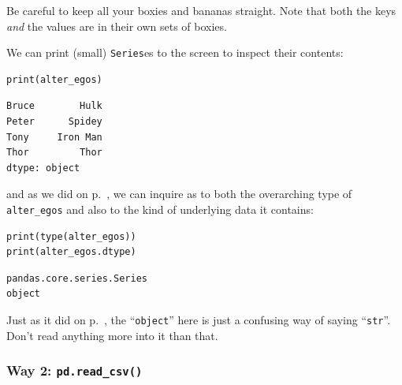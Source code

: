 
Be careful to keep all your boxies and bananas straight. Note that both the
keys \textit{and} the values are in their own sets of boxies.

We can print (small) \texttt{Series}es to the screen to inspect their contents:

\begin{Verbatim}[fontsize=\small,samepage=true,frame=single,framesep=3mm]
print(alter_egos)
\end{Verbatim}

\begin{Verbatim}[fontsize=\small,samepage=true,frame=leftline,framesep=5mm,framerule=1mm]
Bruce        Hulk
Peter      Spidey
Tony     Iron Man
Thor         Thor
dtype: object
\end{Verbatim}

and as we did on p.~\pageref{arrayType}, we can inquire as to both the
overarching type of \texttt{alter\_egos} and also to the kind of underlying
data it contains:

\begin{Verbatim}[fontsize=\small,samepage=true,frame=single,framesep=3mm]
print(type(alter_egos))
print(alter_egos.dtype)
\end{Verbatim}

\begin{Verbatim}[fontsize=\small,samepage=true,frame=leftline,framesep=5mm,framerule=1mm]
pandas.core.series.Series
object
\end{Verbatim}

Just as it did on p.~\pageref{dtypeRules}, the ``\texttt{object}'' here is just
a confusing way of saying ``\texttt{str}''. Don't read anything more into it
than that.

\subsubsection{Way 2: \texttt{pd.read\_csv()}}
